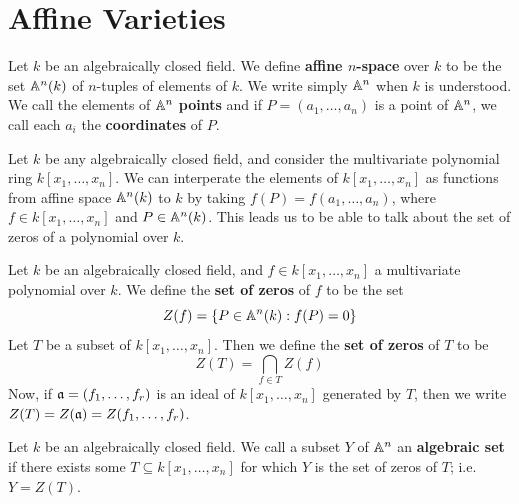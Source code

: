 \section{Affine Varieties}

\begin{definition}
    Let $k$ be an algebraically closed field. We define  \textbf{affine
    $n$-space} over $k$ to be the set $\mathbb{A}^n(k)$ of $n$-tuples of elements of
    $k$. We write simply $\mathbb{A}^n$ when  $k$ is understood. We call the elements of
    $\mathbb{A}^n$  \textbf{points} and if $P=(a_1, \dots, a_n)$ is a point of $\mathbb{A}^n$,
    we call each $a_i$ the \textbf{coordinates} of $P$.
\end{definition}

\begin{example}\label{example_1.1}
    Let $k$ be any algebraically closed field, and consider the multivariate
    polynomial ring $k[x_1, \dots, x_n]$. We can interperate the elements of
    $k[x_1, \dots, x_n]$ as functions from affine space $\mathbb{A}^n(k)$ to $k$ by
    taking  $f(P)=f(a_1, \dots, a_n)$, where $f \in k[x_1, \dots, x_n]$ and $P
    \in \mathbb{A}^n(k)$. This leads us to be able to talk about the set of zeros of a
    polynomial over $k$.
\end{example}

\begin{definition}
    Let $k$ be an algebraically closed field, and $f \in k[x_1, \dots, x_n]$ a
    multivariate polynomial over $k$. We define the \textbf{set of zeros} of $f$
    to be the set
    \begin{equation*}
        Z(f)=\{P \in \mathbb{A}^n(k) : f(P)=0\}
    \end{equation*}
    Let $T$ be a subset of  $k[x_1, \dots, x_n]$. Then we define the \textbf{set
    of zeros} of $T$ to be
    \begin{equation*}
        Z(T)=\bigcap_{f \in T}{Z(f)}
    \end{equation*}
    Now, if $\mathfrak{a}=(f_1, \dots, f_r)$ is an ideal of  $k[x_1, \dots, x_n]$ generated
    by $T$, then we write  $Z(T)=Z(\mathfrak{a})=Z(f_1, \dots, f_r)$.
\end{definition}

\begin{definition}
    Let $k$ be an algebraically closed field. We call a subset $Y$ of $\mathbb{A}^n$ an
    \textbf{algebraic set} if there exists some $T \subseteq k[x_1, \dots, x_n]$
    for which $Y$ is the set of zeros of $T$; i.e. $Y=Z(T)$.
\end{definition}

